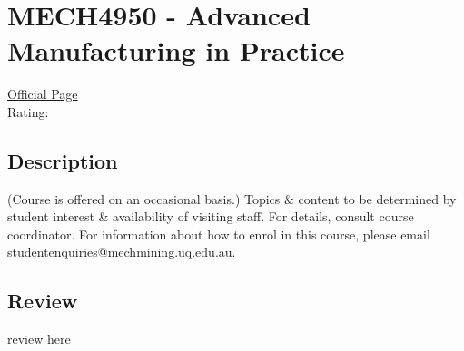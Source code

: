 \hypertarget{MECH4950}{\section{MECH4950 - Advanced Manufacturing in Practice}}

\large
\textcolor{turbo_purple}{\href{https://my.uq.edu.au/programs-courses/course.html?course_code=MECH4950}{Official Page}} \\
Rating: \cstar\cstar\cstar\cstar\ostar

\normalsize
\subsection*{Description}
(Course is offered on an occasional basis.) Topics \& content to be determined by student interest \& availability of visiting staff.
For details, consult course coordinator.
For information about how to enrol in this course, please email studentenquiries@mechmining.uq.edu.au.

\subsection*{Review}
review here
